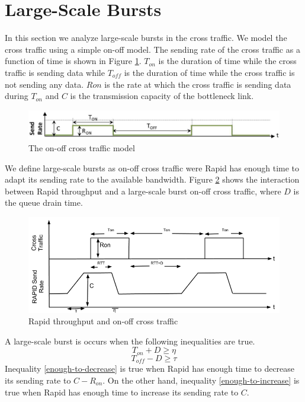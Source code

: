 \section{Large-Scale Bursts}
  In this section we analyze large-scale bursts in the cross traffic. We model 
  the cross traffic using a simple on-off model. The sending rate of the cross 
  traffic as a function of time is shown in Figure \ref{cross-traffic}. 
  $T_{on}$ is the duration of time while the cross traffic is sending data 
  while $T_{off}$ is the duration of time while the cross traffic is not 
  sending any data. $Ron$ is the rate at which the cross traffic is sending 
  data during $T_{on}$ and $C$ is the transmission capacity of the bottleneck 
  link.
  \begin{figure}[hbp]
    \includegraphics[scale=0.35]{img/cross-traffic.png}
    \caption{The on-off cross traffic model}
    \label{cross-traffic}
  \end{figure}

  We define large-scale bursts as on-off cross traffic were Rapid has 
  enough time to adapt its sending rate to the available bandwidth. Figure 
  \ref{large-burst} shows the interaction between Rapid throughput and a 
  large-scale burst on-off cross traffic, where $D$ is the queue drain time.
  \begin{figure}[hbp]
    \includegraphics[scale=0.5]{img/large-burst.png}
    \caption{Rapid throughput and on-off cross traffic}
    \label{large-burst}
  \end{figure}
  
  A large-scale burst is occurs when the following inequalities are true.
  \begin{equation}
    T_{on} + D \ge \eta
    \label{enough-to-decrease}
  \end{equation}
  \begin{equation}
    T_{off} - D \ge \tau
    \label{enough-to-increase}
  \end{equation}
  Inequality \eqref{enough-to-decrease} is true when Rapid has enough time 
  to decrease its sending rate to $C - R_{on}$. On the other hand, inequality 
  \eqref{enough-to-increase} is true when Rapid has enough time to increase 
  its sending rate to $C$.

